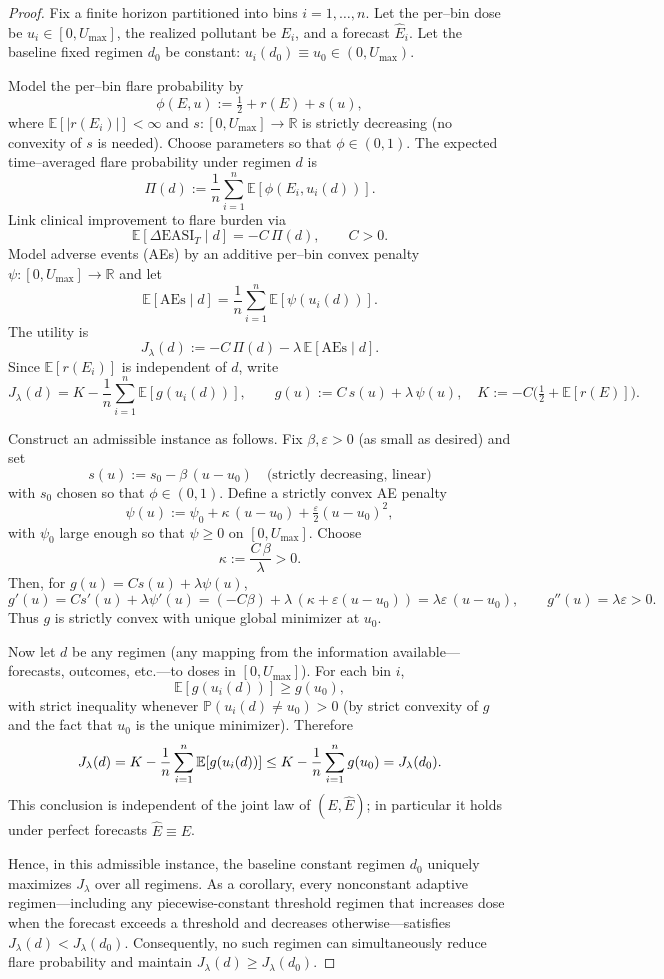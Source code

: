 \begin{proof}
Fix a finite horizon partitioned into bins \(i=1,\dots,n\). Let the per--bin dose be \(u_i\in[0,U_{\max}]\), the realized pollutant be \(E_i\), and a forecast \(\widehat E_i\). Let the baseline fixed regimen \(d_0\) be constant: \(u_i(d_0)\equiv u_0\in(0,U_{\max})\).

Model the per--bin flare probability by
\[
\phi(E,u):=\tfrac12+r(E)+s(u),
\]
where \(\mathbb{E}[|r(E_i)|]<\infty\) and \(s:[0,U_{\max}]\to\mathbb{R}\) is strictly decreasing (no convexity of \(s\) is needed). Choose parameters so that \(\phi\in(0,1)\). The expected time--averaged flare probability under regimen \(d\) is
\[
\Pi(d):=\frac1n\sum_{i=1}^n\mathbb{E}[\phi(E_i,u_i(d))].
\]
Link clinical improvement to flare burden via
\[
\mathbb{E}[\Delta\mathrm{EASI}_T\mid d] = -C\,\Pi(d),\qquad C>0.
\]
Model adverse events (AEs) by an additive per--bin convex penalty \(\psi:[0,U_{\max}]\to\mathbb{R}\) and let
\[
\mathbb{E}[\mathrm{AEs}\mid d]=\frac1n\sum_{i=1}^n\mathbb{E}[\psi(u_i(d))].
\]
The utility is
\[
J_\lambda(d):=-C\,\Pi(d)-\lambda\,\mathbb{E}[\mathrm{AEs}\mid d].
\]
Since \(\mathbb{E}[r(E_i)]\) is independent of \(d\), write
\[
J_\lambda(d)=K-\frac1n\sum_{i=1}^n\mathbb{E}[g(u_i(d))],\qquad g(u):=C\,s(u)+\lambda\,\psi(u),\quad K:=-C\Big(\tfrac12+\mathbb{E}[r(E)]\Big).
\]

Construct an admissible instance as follows. Fix \(\beta,\varepsilon>0\) (as small as desired) and set
\[
 s(u):=s_0-\beta\,(u-u_0) \quad\text{(strictly decreasing, linear)}
\]
with \(s_0\) chosen so that \(\phi\in(0,1)\). Define a strictly convex AE penalty
\[
 \psi(u):=\psi_0+\kappa\,(u-u_0)+\tfrac{\varepsilon}{2}(u-u_0)^2,
\]
with \(\psi_0\) large enough so that \(\psi\ge0\) on \([0,U_{\max}]\). Choose
\[
 \kappa:=\frac{C\,\beta}{\lambda}>0.
\]
Then, for \(g(u)=C s(u)+\lambda \psi(u)\),
\[
 g'(u)=C s'(u)+\lambda \psi'(u)=(-C\beta)+\lambda\,(\kappa+\varepsilon(u-u_0))=\lambda\varepsilon\,(u-u_0),\qquad g''(u)=\lambda\varepsilon>0.
\]
Thus \(g\) is strictly convex with unique global minimizer at \(u_0\).

Now let \(d\) be any regimen (any mapping from the information available---forecasts, outcomes, etc.---to doses in \([0,U_{\max}]\)). For each bin \(i\),
\[
 \mathbb{E}[g(u_i(d))]\ge g(u_0),
\]
with strict inequality whenever \(\mathbb{P}(u_i(d)\ne u_0)>0\) (by strict convexity of \(g\) and the fact that \(u_0\) is the unique minimizer). Therefore
\[
 J_\lambda(d)=K-\frac1n\sum_{i=1}^n\mathbb{E}[g(u_i(d))]\le K-\frac1n\sum_{i=1}^n g(u_0)=J_\lambda(d_0).\qedhere
\]
This conclusion is independent of the joint law of \((E,\widehat E)\); in particular it holds under perfect forecasts \(\widehat E\equiv E\).

Hence, in this admissible instance, the baseline constant regimen \(d_0\) uniquely maximizes \(J_\lambda\) over all regimens. As a corollary, every nonconstant adaptive regimen---including any piecewise-constant threshold regimen that increases dose when the forecast exceeds a threshold and decreases otherwise---satisfies \(J_\lambda(d)<J_\lambda(d_0)\). Consequently, no such regimen can simultaneously reduce flare probability and maintain \(J_\lambda(d)\ge J_\lambda(d_0)\).
\end{proof}
